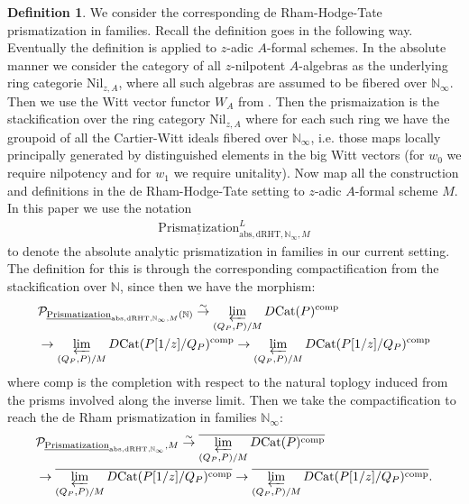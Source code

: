 \documentclass[12pt]{article}
\theoremstyle{definition}
\newtheorem{definition}{Definition}
\begin{document}
\begin{definition}
We consider the corresponding de Rham-Hodge-Tate prismatization in families. Recall the definition goes in the following way. Eventually the definition is applied to $z$-adic $A$-formal schemes. In the absolute manner we consider the category of all $z$-nilpotent $A$-algebras as the underlying ring categorie $\mathrm{Nil}_{z,A}$, where all such algebras are assumed to be fibered over $\mathbb{N}_\infty$. Then we use the Witt vector functor $W_A$ from \cite{3LH}. Then the prismaization is the stackification over the ring category $\mathrm{Nil}_{z,A}$ where for each such ring we have the groupoid of all the Cartier-Witt ideals fibered over $\mathbb{N}_\infty$, i.e. those maps locally principally generated by distinguished elements in the big Witt vectors (for $w_0$ we require nilpotency and for $w_1$ we require unitality). Now map all the construction and definitions in the de Rham-Hodge-Tate setting to $z$-adic $A$-formal scheme $M$. In this paper we use the notation 
\begin{align}
\underline{\mathrm{Prismatization}}^L_{\mathrm{abs},\mathrm{dRHT},\mathbb{N}_\infty,M}
\end{align}
to denote the absolute analytic prismatization in families in our current setting. The definition for this is through the corresponding compactification from the stackification over $\mathbb{N}$, since then we have the morphism:
\begin{align}
&\mathcal{P}_{\underline{\mathrm{Prismatization}}_{\mathrm{abs},\mathrm{dRHT},\mathbb{N}_\infty,M}(\mathbb{N})} \overset{\sim}{\rightarrow} \varprojlim_{(Q_P,P)/M} D\mathrm{Cat}(P)^\mathrm{comp}\\
&\rightarrow \varprojlim_{(Q_P,P)/M} D\mathrm{Cat}(P[1/z]/{Q_P})^\mathrm{comp}\rightarrow \varprojlim_{(Q_P,P)/M} D\mathrm{Cat}(P[1/z]/{Q_P})^\mathrm{comp}
\end{align}
where $\mathrm{comp}$ is the completion with respect to the natural toplogy induced from the prisms involved along the inverse limit. Then we take the compactification to reach the de Rham prismatization in families $\mathbb{N}_\infty$:
\begin{align}
&\mathcal{P}_{\underline{\mathrm{Prismatization}}_{\mathrm{abs},\mathrm{dRHT},\mathbb{N}_\infty},M} \overset{\sim}{\rightarrow} \overline{\varprojlim_{(Q_P,P)/M} D\mathrm{Cat}(P)^\mathrm{comp}}\\
&\rightarrow \overline{\varprojlim_{(Q_P,P)/M} D\mathrm{Cat}(P[1/z]/{Q_P})^\mathrm{comp}}\rightarrow \overline{\varprojlim_{(Q_P,P)/M} D\mathrm{Cat}(P[1/z]/{Q_P})^\mathrm{comp}}.

\end{align}
\end{definition}
\end{document}
